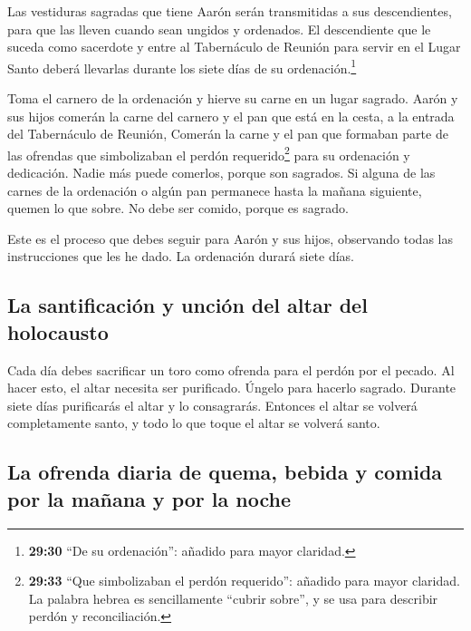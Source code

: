  Las vestiduras sagradas que tiene Aarón serán
transmitidas a sus descendientes, para que las lleven cuando sean
ungidos y ordenados.  El descendiente que le suceda como
sacerdote y entre al Tabernáculo de Reunión para servir en el Lugar
Santo deberá llevarlas durante los siete días de su
ordenación.\footnote{\textbf{29:30} ``De su ordenación'': añadido para
  mayor claridad.}

 Toma el carnero de la ordenación y hierve su carne en un
lugar sagrado.  Aarón y sus hijos comerán la carne del
carnero y el pan que está en la cesta, a la entrada del Tabernáculo de
Reunión,  Comerán la carne y el pan que formaban parte de
las ofrendas que simbolizaban el perdón requerido\footnote{\textbf{29:33}
  ``Que simbolizaban el perdón requerido'': añadido para mayor claridad.
  La palabra hebrea es sencillamente ``cubrir sobre'', y se usa para
  describir perdón y reconciliación.} para su ordenación y dedicación.
Nadie más puede comerlos, porque son sagrados.  Si alguna
de las carnes de la ordenación o algún pan permanece hasta la mañana
siguiente, quemen lo que sobre. No debe ser comido, porque es sagrado.

 Este es el proceso que debes seguir para Aarón y sus
hijos, observando todas las instrucciones que les he dado. La ordenación
durará siete días.

\hypertarget{la-santificaciuxf3n-y-unciuxf3n-del-altar-del-holocausto}{%
\subsection{La santificación y unción del altar del
holocausto}\label{la-santificaciuxf3n-y-unciuxf3n-del-altar-del-holocausto}}

 Cada día debes sacrificar un toro como ofrenda para el
perdón por el pecado. Al hacer esto, el altar necesita ser purificado.
Úngelo para hacerlo sagrado.  Durante siete días
purificarás el altar y lo consagrarás. Entonces el altar se volverá
completamente santo, y todo lo que toque el altar se volverá santo.

\hypertarget{la-ofrenda-diaria-de-quema-bebida-y-comida-por-la-mauxf1ana-y-por-la-noche}{%
\subsection{La ofrenda diaria de quema, bebida y comida por la mañana y
por la
noche}\label{la-ofrenda-diaria-de-quema-bebida-y-comida-por-la-mauxf1ana-y-por-la-noche}}


